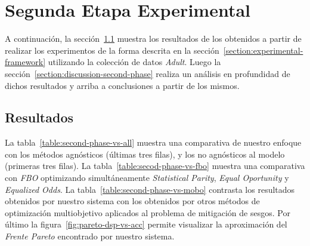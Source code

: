 \section{Segunda Etapa Experimental}\label{section:experiments-second-phase}

A continuación, la sección~\ref{section:results-second-phase} muestra los resultados de los obtenidos a partir de realizar los experimentos de la forma descrita en la sección~\ref{section:experimental-framework} utilizando la colección de datos \emph{Adult}.
Luego la sección~\ref{section:discussion-second-phase} realiza un análisis en profundidad de dichos resultados y arriba a conclusiones a partir de los mismos.

\subsection{Resultados}\label{section:results-second-phase}

La tabla~\ref{table:second-phase-vs-all} muestra una comparativa de nuestro enfoque con los métodos agnósticos (últimas tres filas), y los no agnósticos al modelo (primeras tres filas).
La tabla~\ref{table:secod-phase-vs-fbo} muestra una comparativa con \emph{FBO} optimizando simultáneamente \emph{Statistical Parity}, \emph{Equal Oportunity} y \emph{Equalized Odds}.
La tabla~\ref{table:second-phase-vs-mobo} contrasta los resultados obtenidos por nuestro sistema con los obtenidos por otros métodos de optimización multiobjetivo aplicados al problema de mitigación de sesgos.
Por último la figura~\ref{fig:pareto-dsp-vs-acc} permite visualizar la aproximación del \emph{Frente Pareto} encontrado por nuestro sistema.

